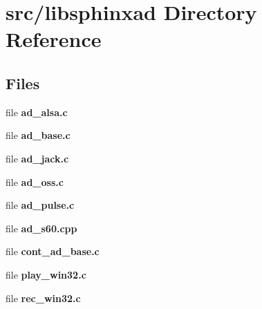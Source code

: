 \section{src/libsphinxad Directory Reference}
\label{dir_6b434913578e1a30215dcd3a2a20216a}
\subsection*{Files}
\begin{DoxyCompactItemize}
\item 
file {\bfseries ad\-\_\-alsa.\-c}
\item 
file {\bfseries ad\-\_\-base.\-c}
\item 
file {\bfseries ad\-\_\-jack.\-c}
\item 
file {\bfseries ad\-\_\-oss.\-c}
\item 
file {\bfseries ad\-\_\-pulse.\-c}
\item 
file {\bfseries ad\-\_\-s60.\-cpp}
\item 
file {\bfseries cont\-\_\-ad\-\_\-base.\-c}
\item 
file {\bfseries play\-\_\-win32.\-c}
\item 
file {\bfseries rec\-\_\-win32.\-c}
\end{DoxyCompactItemize}
